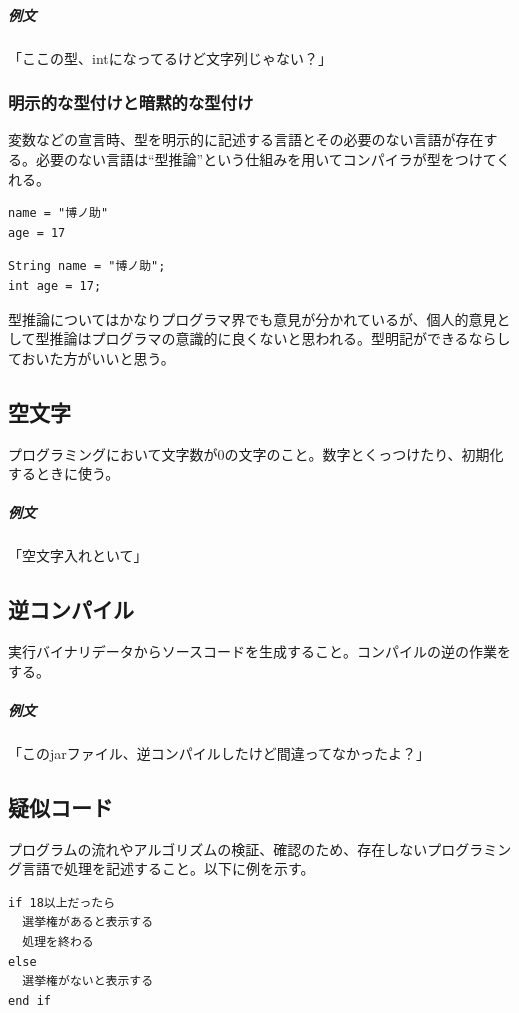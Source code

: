 \documentclass[dvipdfmx,jb5]{jreport}
\begin{document}
\subparagraph{例文} 「ここの型、intになってるけど文字列じゃない？」

\subsubsection{明示的な型付けと暗黙的な型付け}
変数などの宣言時、型を明示的に記述する言語とその必要のない言語が存在する。必要のない言語は``型推論''という仕組みを用いてコンパイラが型をつけてくれる。

\lstset{language=Ruby}
\begin{lstlisting}[caption=型推論を行う言語の例（Ruby）]
name = "博ノ助"
age = 17
\end{lstlisting}

\lstset{language=Java}
\begin{lstlisting}[caption=型推論を行なわない言語の例（Java）]
String name = "博ノ助";
int age = 17;
\end{lstlisting}

型推論についてはかなりプログラマ界でも意見が分かれているが、個人的意見として型推論はプログラマの意識的に良くないと思われる。型明記ができるならしておいた方がいいと思う。

\subsection{空文字}
プログラミングにおいて文字数が0の文字のこと。数字とくっつけたり、初期化するときに使う。

\subparagraph{例文} 「空文字入れといて」

\subsection{逆コンパイル}
実行バイナリデータからソースコードを生成すること。コンパイルの逆の作業をする。

\subparagraph{例文} 「このjarファイル、逆コンパイルしたけど間違ってなかったよ？」

\subsection{疑似コード}
プログラムの流れやアルゴリズムの検証、確認のため、存在しないプログラミング言語で処理を記述すること。以下に例を示す。

\lstset{language=}
\begin{lstlisting}
if 18以上だったら
  選挙権があると表示する
  処理を終わる
else
  選挙権がないと表示する
end if
\end{lstlisting}
\end{document}
